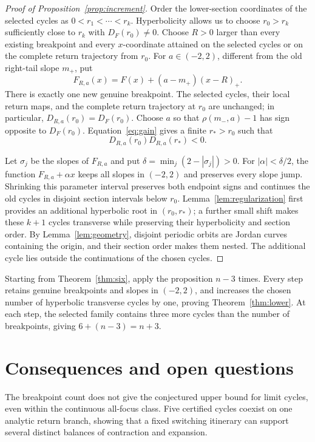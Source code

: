 \documentclass[11pt]{article}
\theoremstyle{remark}
\begin{document}
\begin{proof}[Proof of Proposition~\ref{prop:increment}]
Order the lower-section coordinates of the selected cycles as
\(0<r_1<\cdots<r_k\).  Hyperbolicity allows us to choose \(r_0>r_k\)
sufficiently close to \(r_k\) with \(D_F(r_0)\ne0\).  Choose \(R>0\)
larger than every existing breakpoint and every \(x\)-coordinate attained
on the selected cycles or on the complete return trajectory from \(r_0\).
For \(a\in(-2,2)\), different from the old right-tail slope \(m_+\), put
\[
             F_{R,a}(x)=F(x)+(a-m_+)(x-R)_+.
\]
There is exactly one new genuine breakpoint.  The selected cycles, their
local return maps, and the complete return trajectory at \(r_0\) are
unchanged; in particular, \(D_{R,a}(r_0)=D_F(r_0)\).  Choose \(a\)
so that \(\rho(m_-,a)-1\) has sign opposite to \(D_F(r_0)\).
Equation~\eqref{eq:gain} gives a finite \(r_*>r_0\) such that
\[
                  D_{R,a}(r_0)D_{R,a}(r_*)<0.
\]

Let \(\sigma_j\) be the slopes of \(F_{R,a}\) and put
\(\delta=\min_j(2-|\sigma_j|)>0\).  For \(|\alpha|<\delta/2\),
the function \(F_{R,a}+\alpha x\) keeps all slopes in \((-2,2)\)
and preserves every slope jump.  Shrinking this parameter interval
preserves both endpoint signs and continues the old cycles in disjoint
section intervals below \(r_0\).  Lemma~\ref{lem:regularization} first
provides an additional hyperbolic root in \((r_0,r_*)\); a further small
shift makes these \(k+1\) cycles transverse while preserving their
hyperbolicity and section order.  By Lemma~\ref{lem:geometry}, disjoint
periodic orbits are Jordan curves containing the origin, and their
section order makes them nested.  The additional cycle lies outside
the continuations of the chosen cycles.
\end{proof}

Starting from Theorem~\ref{thm:six}, apply the proposition \(n-3\) times.
Every step retains genuine breakpoints and slopes in \((-2,2)\), and
increases the chosen number of hyperbolic transverse cycles by one,
proving Theorem~\ref{thm:lower}.  At each step, the selected family contains
three more cycles than the number of breakpoints, giving \(6+(n-3)=n+3\).

\section{Consequences and open questions}

The breakpoint count does not give the conjectured upper bound for limit
cycles, even within the continuous all-focus class.  Five certified cycles
coexist on one analytic return branch, showing that a fixed switching
itinerary can support several distinct balances of contraction and
expansion.
\end{document}
